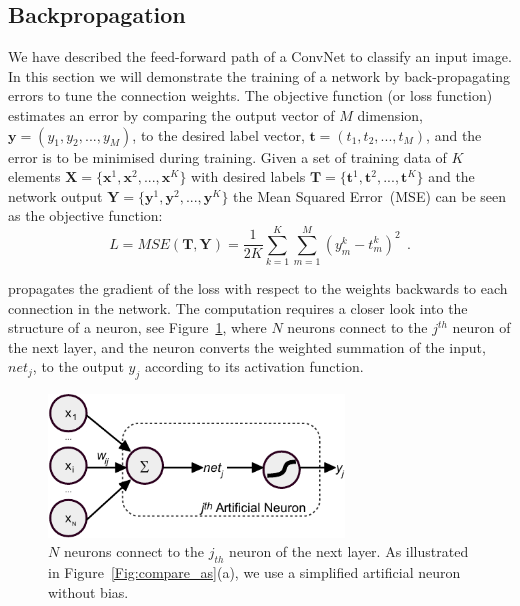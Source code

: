 
\subsection{Backpropagation}
We have described the feed-forward path of a ConvNet to classify an input image.
In this section we will demonstrate the training of a network by back-propagating errors to tune the connection weights.
The objective function (or loss function) estimates an error by comparing the output vector of $M$ dimension, $\mathbf{y}=(y_1,y_2,...,y_M)$, to the desired label vector, $\mathbf{t}=(t_1,t_2,...,t_M)$, and the error is to be minimised during training.
Given a set of training data of $K$ elements $\mathbf{X}=\{\mathbf{x}^1, \mathbf{x}^2, ..., \mathbf{x}^K\}$ with desired labels $\mathbf{T}=\{\mathbf{t}^1, \mathbf{t}^2, ..., \mathbf{t}^K\}$ and the network output $\mathbf{Y}=\{\mathbf{y}^1, \mathbf{y}^2, ..., \mathbf{y}^K\}$ the Mean Squared Error~(MSE) can be seen as the objective function:  
\begin{equation}
L={MSE}(\mathbf{T}, \mathbf{Y}) =\frac{1}{2K}\sum_{k=1}^K \sum_{m=1}^M (y^{k}_{m}-t^{k}_{m})^{2}~~.
\label{equ:loss_all}
\end{equation}

\DIFdelbegin {}\DIFdelend \DIFaddbegin {}\DIFaddend propagates the gradient of the loss with respect to the weights backwards to each connection in the network.
The computation requires a closer look into the structure of a neuron, see Figure~\ref{Fig:neuron_net}, where $N$ neurons connect to the $j^{th}$ neuron of the next layer, and the neuron converts the weighted summation of the input, $net_j$, to the output $y_j$ according to its activation function.
\begin{figure}[bt]
	\centering
	\includegraphics[width=0.7\textwidth]{pics_iconip/neuron.pdf}
	\caption[An artificial neuron.]{$N$ neurons connect to the $j_{th}$ neuron of the next layer. As illustrated in Figure~\ref{Fig:compare_as}(a), we use a simplified artificial neuron without bias.}
	\label{Fig:neuron_net}
\end{figure}


